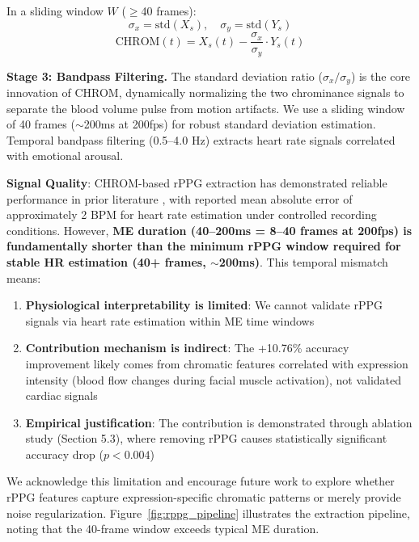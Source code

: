 \documentclass[preprint,12pt,authoryear]{elsarticle}
\begin{document}
In a sliding window $W$ ($\geq$40 frames):
\begin{equation}
\sigma_x = \text{std}(X_s), \quad \sigma_y = \text{std}(Y_s)
\end{equation}
\begin{equation}
\text{CHROM}(t) = X_s(t) - \frac{\sigma_x}{\sigma_y} \cdot Y_s(t)
\end{equation}

\textbf{Stage 3: Bandpass Filtering.} The standard deviation ratio ($\sigma_x/\sigma_y$) is the core innovation of CHROM, dynamically normalizing the two chrominance signals to separate the blood volume pulse from motion artifacts. We use a sliding window of 40 frames ($\sim$200ms at 200fps) for robust standard deviation estimation. Temporal bandpass filtering (0.5--4.0 Hz) extracts heart rate signals correlated with emotional arousal.

\textbf{Signal Quality}: CHROM-based rPPG extraction has demonstrated reliable performance in prior literature \cite{dehaan2013robust}, with reported mean absolute error of approximately 2 BPM for heart rate estimation under controlled recording conditions. However, \textbf{ME duration (40--200ms = 8--40 frames at 200fps) is fundamentally shorter than the minimum rPPG window required for stable HR estimation (40+ frames, $\sim$200ms)}. This temporal mismatch means:

\begin{enumerate}
\item \textbf{Physiological interpretability is limited}: We cannot validate rPPG signals via heart rate estimation within ME time windows
\item \textbf{Contribution mechanism is indirect}: The +10.76\% accuracy improvement likely comes from chromatic features correlated with expression intensity (blood flow changes during facial muscle activation), not validated cardiac signals
\item \textbf{Empirical justification}: The contribution is demonstrated through ablation study (Section 5.3), where removing rPPG causes statistically significant accuracy drop ($p<0.004$)
\end{enumerate}

We acknowledge this limitation and encourage future work to explore whether rPPG features capture expression-specific chromatic patterns or merely provide noise regularization. Figure~\ref{fig:rppg_pipeline} illustrates the extraction pipeline, noting that the 40-frame window exceeds typical ME duration.
\end{document}
